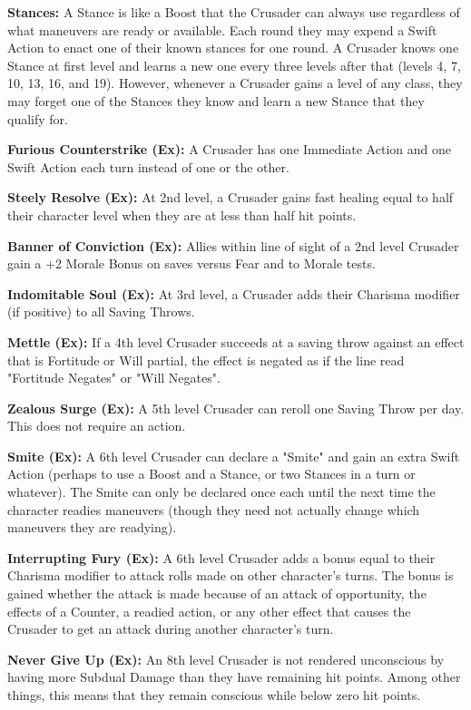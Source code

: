 \textbf{Stances:} A Stance is like a Boost that the Crusader can always use regardless of what maneuvers are ready or available. Each round they may expend a Swift Action to enact one of their known stances for one round. A Crusader knows one Stance at first level and learns a new one every three levels after that (levels 4, 7, 10, 13, 16, and 19). However, whenever a Crusader gains a level of any class, they may forget one of the Stances they know and learn a new Stance that they qualify for.

\textbf{Furious Counterstrike (Ex):} A Crusader has one Immediate Action and one Swift Action each turn instead of one or the other.

\textbf{Steely Resolve (Ex):} At 2nd level, a Crusader gains fast healing equal to half their character level when they are at less than half hit points.

\textbf{Banner of Conviction (Ex):} Allies within line of sight of a 2nd level Crusader gain a +2 Morale Bonus on saves versus Fear and to Morale tests.

\textbf{Indomitable Soul (Ex):} At 3rd level, a Crusader adds their Charisma modifier (if positive) to all Saving Throws.

\textbf{Mettle (Ex):} If a 4th level Crusader succeeds at a saving throw against an effect that is Fortitude or Will partial, the effect is negated as if the line read "Fortitude Negates" or "Will Negates".

\textbf{Zealous Surge (Ex):} A 5th level Crusader can reroll one Saving Throw per day. This does not require an action.

\textbf{Smite (Ex):} A 6th level Crusader can declare a "Smite" and gain an extra Swift Action (perhaps to use a Boost and a Stance, or two Stances in a turn or whatever). The Smite can only be declared once each until the next time the character readies maneuvers (though they need not actually change which maneuvers they are readying).

\textbf{Interrupting Fury (Ex):} A 6th level Crusader adds a bonus equal to their Charisma modifier to attack rolls made on other character's turns. The bonus is gained whether the attack is made because of an attack of opportunity, the effects of a Counter, a readied action, or any other effect that causes the Crusader to get an attack during another character's turn.

\textbf{Never Give Up (Ex):} An 8th level Crusader is not rendered unconscious by having more Subdual Damage than they have remaining hit points. Among other things, this means that they remain conscious while below zero hit points.

